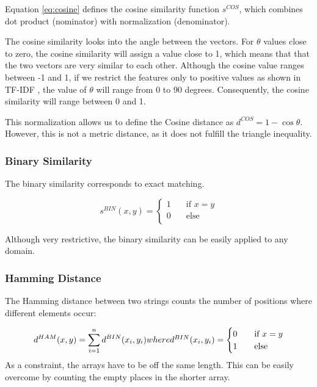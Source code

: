 Equation \ref{eq:cosine} defines the cosine similarity function $s^{COS}$, which combines dot product (nominator) with normalization (denominator).

The cosine similarity looks into the angle between the vectors. 
For $\theta$ values close to zero, the cosine similarity will assign a value close to 1, which means that that the two vectors are very similar to each other. 
Although the cosine value ranges between -1 and 1, if we restrict the features only to positive values as shown in TF-IDF 
, the value of $\theta$ will range from 0 to 90 degrees. 
Consequently, the cosine similarity will range between 0 and 1.

This normalization allows us to define the Cosine distance as 
$d^{COS}=1 - \cos \theta$. 
However, this is not a metric distance, as it does not fulfill the triangle inequality.

\subsubsection{Binary Similarity}
The binary similarity corresponds to exact matching. 

\begin{equation}
s^{BIN}(x,y)=
\begin{cases}
1  & \quad \text{if } x=y \\
0  & \quad \text{else }\\
\end{cases}
\label{eq:binary} 
\end{equation}

Although very restrictive, the binary similarity can be easily applied to any domain. 
 
\subsubsection{Hamming Distance}
The Hamming distance between two strings counts the number of positions where different elements occur:

\begin{equation}
	d^{HAM}(x,y) = \sum_{i=1}^{n}d^{BIN}(x_{i},y_{i}) $$where$$ 
	d^{BIN}(x_{i},y_{i})=
	\begin{cases}
	0  & \quad \text{if } x=y \\
	1  & \quad \text{else }\\
	\end{cases}
\end{equation}
As a constraint, the arrays have to be off the same length. 
This can be easily overcome by counting the empty places in the shorter array. 

